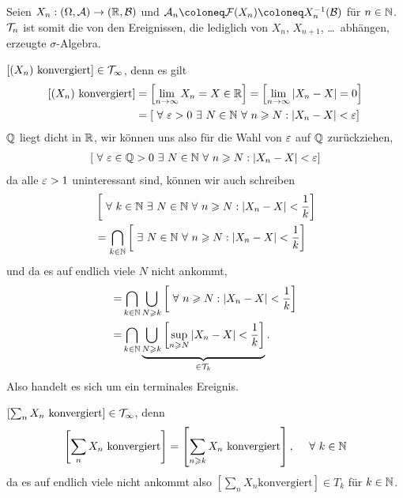 \begin{bsp}
Seien $X_{n}: (\Omega, \mathcal{A})\to (\mathbb{R}, {\mathcal{B}})$ und
$\AA_{n} \defl {\FF}(X_{n}) \defl X^ {-1}_{n}({\BB})$ für $n\in\mathbb{N}$.
$\mathcal{T}_n$ ist somit die von den Ereignissen, die lediglich von $X_n$,
$X_{n+1}$, \ldots\ abhängen, erzeugte $\sigma$-Algebra.
\begin{bspenum}
\item
$\left[(X_{n}) \text{ konvergiert}\right]\in {\mathcal{T}}_{\infty}$, denn es gilt
\begin{align*}
\left[(X_{n}) \text{ konvergiert}\right] &=
\left[\lim_{n\to\infty} X_{n} = X\in \R\right]
=
\left[\lim_{n\to\infty} \abs{X_{n} - X} = 0 \right]\\
&=
\left[\forall \ep > 0\exists N\in\N \forall n\ge N : \abs{X_{n} - X} <\ep
\right]
\end{align*}
$\mathbb{Q}$ liegt dicht in $\mathbb{R}$, wir können uns also für die Wahl von $\varepsilon$ auf $\mathbb{Q}$
zurückziehen,
\begin{align*}
\left[\forall \ep\in\Q > 0\exists N\in\N \forall n\ge N : \abs{X_{n} - X}
<\ep\right]
\end{align*}
da alle $\varepsilon >1$ uninteressant sind, können wir auch schreiben
\begin{align*}
&\left[\forall k\in\N \exists N\in\N \forall n\ge N : \abs{X_{n} - X}
<\frac{1}{k}\right]\\
&= 
\bigcap_{k\in\N}
\left[\exists N\in\N \forall n\ge N : \abs{X_{n} - X}
<\frac{1}{k}\right]
\end{align*}
und da es auf endlich viele $N$ nicht ankommt,
\begin{align*}
=&\bigcap_{k\in\N}\bigcup_{N\ge k}
\left[\forall n\ge N : \abs{X_{n} - X} <\frac{1}{k}\right]\\
=&\bigcap_{k\in\N}\underbrace{\bigcup_{N\ge k}
\left[\sup_{n\ge N} \abs{X_{n} - X} <\frac{1}{k}\right]}_{\in
\TT_k}.
\end{align*}
Also handelt es sich um ein terminales Ereignis.
\item
$\left[\sum_n X_{n}\text{ konvergiert}\right]\in {\mathcal{T}}_{\infty}$, denn
\begin{align*}
\left[\sum_n X_{n}\text{ konvergiert}\right] = 
\left[\sum_{n\ge k} X_{n}\text{ konvergiert}\right],\quad \forall k\in\N
\end{align*}
da es auf endlich viele nicht ankommt also $\left[\sum_{n} X_{n}\text{
konvergiert}\right]\in T_k$ für $k\in\mathbb{N}$.\bsphere
\end{bspenum}
\end{bsp}
